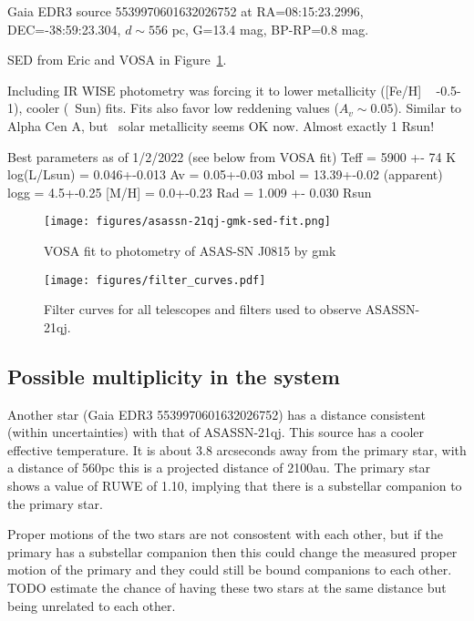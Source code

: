 \documentclass{aa}
\begin{document}
Gaia EDR3 source 5539970601632026752 at RA=08:15:23.2996, DEC=-38:59:23.304, $d\sim 556$ pc, G=13.4 mag, BP-RP=0.8 mag.

SED from Eric and VOSA in Figure~\ref{fig:sed}.

 Including IR WISE photometry
was forcing it to lower metallicity ([Fe/H] ~ -0.5-1), cooler (~Sun) fits. Fits also favor low reddening values ($A_v\sim 0.05$). 
Similar to Alpha Cen A, but ~solar metallicity seems OK now. Almost exactly 1 Rsun! 

Best parameters as of 1/2/2022 (see below from VOSA fit) 
Teff = 5900 +- 74 K
log(L/Lsun) = 0.046+-0.013 
Av = 0.05+-0.03
mbol = 13.39+-0.02 (apparent)
logg = 4.5+-0.25
[M/H] = 0.0+-0.23 
Rad = 1.009 +- 0.030 Rsun


\begin{figure}
   \centering
   \texttt{[image: figures/asassn-21qj-gmk-sed-fit.png]}
      \caption{VOSA fit to photometry of ASAS-SN J0815 by gmk}
         \label{fig:sed}
\end{figure}



\begin{figure}
   \begin{centering}
   \texttt{[image: figures/filter\_curves.pdf]}
      \caption{Filter curves for all telescopes and filters used to observe ASASSN-21qj.}
      \label{fig:allfilters}
      \end{centering}
\end{figure}



\subsection{Possible multiplicity in the  system}

Another star (Gaia EDR3 5539970601632026752) has a distance consistent (within uncertainties) with that of ASASSN-21qj.
%
This source has a cooler effective temperature.
%
It is about 3.8 arcseconds away from the primary star, with a distance of 560pc this is a projected distance of 2100au.
%
The primary star shows a value of RUWE of 1.10, implying that there is a substellar companion to the primary star.

Proper motions of the two stars are not consostent with each other, but if the primary has a substellar companion then this could change the measured proper motion of the primary and they could still be bound companions to each other.
%
TODO estimate the chance of having these two stars at the same distance but being unrelated to each other.
\end{document}
